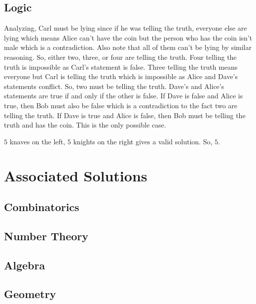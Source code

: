 \documentclass[11pt]{article}
\begin{document}

\subsection{Logic}

\sol Analyzing, Carl must be lying since if he was telling the truth, everyone else are lying which means Alice can't have the coin but the person who has the coin isn't male which is a contradiction. Also note that all of them can't be lying by similar reasoning. So, either two, three, or four are telling the truth. Four telling the truth is impossible as Carl's statement is false. Three telling the truth means everyone but Carl is telling the truth which is impossible as Alice and Dave's statements conflict. So, two must be telling the truth. Dave's and Alice's statements are true if and only if the other is false. If Dave is false and Alice is true, then Bob must also be false which is a contradiction to the fact two are telling the truth. If Dave is true and Alice is false, then Bob must be telling the truth and  has the coin. This is the only possible case.


\sol $5$ knaves on the left, $5$ knights on the right gives a valid solution. So, $\boxed{5}$.
\section{Associated Solutions}
\subsection{Combinatorics}

\setcounter{problem}{0}
\subsection{Number Theory}


\setcounter{problem}{0}
\subsection{Algebra}

\setcounter{problem}{0}
\subsection{Geometry}
\end{document}
